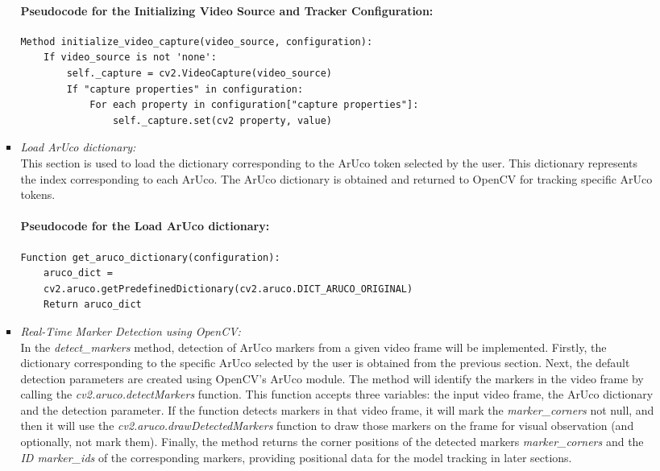\documentclass[12pt]{article}
\begin{document}
\begin{enumerate}
\begin{enumerate}
\begin{itemize}
                                    \paragraph{Pseudocode for the Initializing Video Source and Tracker Configuration:}
                                    \begin{verbatim}
Method initialize_video_capture(video_source, configuration):
    If video_source is not 'none':
        self._capture = cv2.VideoCapture(video_source)
        If "capture properties" in configuration:
            For each property in configuration["capture properties"]:
                self._capture.set(cv2 property, value)
                              \end{verbatim}
                              \item \textit{Load ArUco dictionary:}
                                    \\
                                    This section is used to load the dictionary corresponding to the ArUco token selected by the user. This dictionary represents the index corresponding to each ArUco. The ArUco dictionary is obtained and returned to OpenCV for tracking specific ArUco tokens.
                                    \paragraph{Pseudocode for the Load ArUco dictionary:}
                                    \begin{verbatim}
Function get_aruco_dictionary(configuration):
    aruco_dict = 
    cv2.aruco.getPredefinedDictionary(cv2.aruco.DICT_ARUCO_ORIGINAL)
    Return aruco_dict
                              \end{verbatim}
                              \item \textit{Real-Time Marker Detection using OpenCV:}
                                    \\
                                    In the \emph{detect\_markers} method, detection of ArUco markers from a given video frame will be implemented. Firstly, the dictionary corresponding to the specific ArUco selected by the user is obtained from the previous section. Next, the default detection parameters are created using OpenCV's ArUco module. The method will identify the markers in the video frame by calling the \emph{cv2.aruco.detectMarkers} function. This function accepts three variables: the input video frame, the ArUco dictionary and the detection parameter. If the function detects markers in that video frame, it will mark the \emph{marker\_corners } not null, and then it will use the \emph{cv2.aruco.drawDetectedMarkers} function to draw those markers on the frame for visual observation (and optionally, not mark them). Finally, the method returns the corner positions of the detected markers \emph{ marker\_corners} and the \emph{ID marker\_ids} of the corresponding markers, providing positional data for the model tracking in later sections.

\end{itemize}
\end{enumerate}
\end{enumerate}
\end{document}
